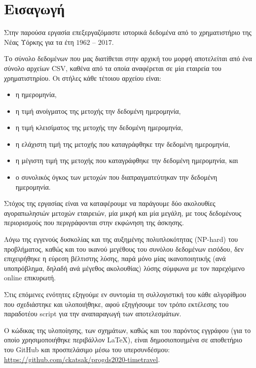 \section{Εισαγωγή}

Στην παρούσα εργασία επεξεργαζόμαστε ιστορικά δεδομένα από το χρηματιστήριο της Νέας Υόρκης για τα έτη $1962$ -- $2017$.

Το σύνολο δεδομένων που μας διατίθεται στην αρχική του μορφή αποτελείται από ένα σύνολο αρχείων CSV, καθένα από τα οποία αναφέρεται σε μία εταιρεία του χρηματιστηρίου.
Οι στήλες κάθε τέτοιου αρχείου είναι:
\begin{itemize}
    \item η ημερομηνία,
    \item η τιμή ανοίγματος της μετοχής την δεδομένη ημερομηνία,
    \item η τιμή κλεισίματος της μετοχής την δεδομένη ημερομηνία,
    \item η ελάχιστη τιμή της μετοχής που καταγράφθηκε την δεδομένη ημερομηνία,
    \item η μέγιστη τιμή της μετοχής που καταγράφθηκε την δεδομένη ημερομηνία, και
    \item ο συνολικός όγκος των μετοχών που διαπραγματεύτηκαν την δεδομένη ημερομηνία.
\end{itemize}

Στόχος της εργασίας είναι να καταφέρουμε να παράγουμε δύο ακολουθίες αγοραπωλησιών μετοχών εταιρειών, μία μικρή και μία μεγάλη, με τους δεδομένους περιορισμούς που περιγράφονται στην εκφώνηση της άσκησης.

Λόγω της εγγενούς δυσκολίας και της αυξημένης πολυπλοκότητας (NP-hard) του προβλήματος, καθώς και του ικανού μεγέθους του συνόλου δεδομένων εισόδου, δεν επιχειρήθηκε η εύρεση βέλτιστης λύσης, παρά μόνο μίας ικανοποιητικής (ανά υποπρόβλημα, δηλαδή ανά μέγεθος ακολουθίας) λύσης σύμφωνα με τον παρεχόμενο online επικυρωτή.

Στις επόμενες ενότητες εξηγούμε εν συντομία τη συλλογιστική του κάθε αλγορίθμου που σχεδιάστηκε και υλοποιήθηκε, αφού εξηγήσουμε τον τρόπο εκτέλεσης του παραδοτέου script για την αναπαραγωγή των αποτελεσμάτων.

Ο κώδικας της υλοποίησης, των σχημάτων, καθώς και του παρόντος εγγράφου (για το οποίο χρησιμοποιήθηκε περιβάλλον \LaTeX), είναι δημοσιοποιημένα σε αποθετήριο του GitHub και προσπελάσιμο μέσω του υπερσυνδέσμου: \url{https://github.com/ckatsak/progds2020-timetravel}.
